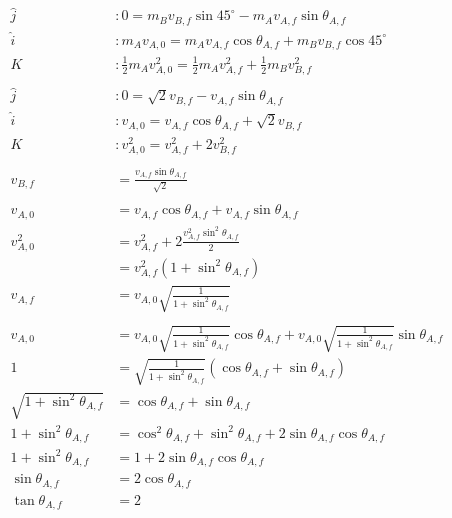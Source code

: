 \documentclass{esg8012pset}
\begin{document}
\begin{solution}
  \begin{align*}
  \hat j& : 0 = m_B v_{B,f}\sin 45^{\circ} - m_A v_{A, f}\sin\theta_{A, f} \\
  \hat i& : m_A v_{A, 0} = m_A v_{A, f}\cos \theta_{A, f} + m_B v_{B, f}\cos 45^{\circ} \\
  K& : \frac{1}{2}m_A v_{A, 0}^2 = \frac{1}{2}m_Av_{A,f}^2 + \frac{1}{2}m_B v_{B, f}^2 \\
  \\
  \hat j& : 0 = \sqrt{2} v_{B,f} - v_{A, f}\sin\theta_{A, f} \\
  \hat i& : v_{A, 0} = v_{A, f}\cos \theta_{A, f} + \sqrt{2}v_{B, f} \\
  K& : v_{A, 0}^2 = v_{A,f}^2 + 2 v_{B, f}^2 \\
  \\
  v_{B,f} & = \frac{v_{A, f}\sin\theta_{A, f}}{\sqrt{2}} \\
  \\
  v_{A, 0} & = v_{A, f}\cos \theta_{A, f} + v_{A, f}\sin\theta_{A, f} \\
  v_{A, 0}^2 & = v_{A,f}^2 + 2 \frac{v_{A, f}^2\sin^2\theta_{A, f}}{2} \\
    & = v_{A,f}^2\left(1 + \sin^2\theta_{A, f}\right) \\
  v_{A, f} & = v_{A, 0}\sqrt{\frac{1}{1 + \sin^2\theta_{A, f}}} \\
  \\
  v_{A, 0} & = v_{A, 0}\sqrt{\frac{1}{1 + \sin^2\theta_{A, f}}}\cos \theta_{A, f} + v_{A, 0}\sqrt{\frac{1}{1 + \sin^2\theta_{A, f}}}\sin\theta_{A, f} \\
  1 & = \sqrt{\frac{1}{1 + \sin^2\theta_{A, f}}}\left(\cos \theta_{A, f} + \sin\theta_{A, f}\right) \\
  \sqrt{1 + \sin^2\theta_{A, f}} & = \cos \theta_{A, f} + \sin\theta_{A, f} \\
  1 + \sin^2\theta_{A, f} & = \cos^2 \theta_{A, f} + \sin^2\theta_{A, f} + 2 \sin \theta_{A, f}\cos \theta_{A, f}\\
  1 + \sin^2\theta_{A, f} & = 1 + 2 \sin \theta_{A, f}\cos \theta_{A, f}\\
  \sin\theta_{A, f} & = 2 \cos \theta_{A, f}\\
  \tan\theta_{A, f} & = 2

\end{align*}
\end{solution}
\end{document}
